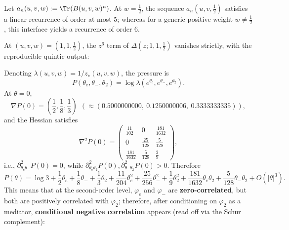 \begin{corollary}\label{cor:sync-kernel-3d-recurrence-drop}
Let \(a_n(u,v,w):=\Tr(B(u,v,w)^n)\).
At \(w=\tfrac12\), the sequence \(a_n(u,v,\tfrac12)\) satisfies a linear recurrence of order at most \(5\);
whereas for a generic positive weight \(w\neq\tfrac12\), this interface yields a recurrence of order \(6\).
\end{corollary}

\begin{proposition}[Critical quintic fingerprint: \texorpdfstring{$(u,v,w)=(1,1,\tfrac12)$}{(u,v,w)=(1,1,1/2)}]\label{prop:sync-kernel-3d-critical-quintic}
At \((u,v,w)=(1,1,\tfrac12)\), the \(z^6\) term of \(\Delta(z;1,1,\tfrac12)\) vanishes strictly, with the reproducible quintic output:

\end{proposition}
Denoting $\lambda(u,v,w)=1/z_\star(u,v,w)$, the pressure is
\[
P(\theta_e,\theta_-,\theta_2)=\log\lambda(e^{\theta_e},e^{\theta_-},e^{\theta_2}).
\]
At $\theta=0$,
\[
\nabla P(0)=\left(\frac12,\frac18,\frac13\right)
\ \ (\approx (0.5000000000,\ 0.1250000006,\ 0.3333333335)),
\]
and the Hessian satisfies
\[
\nabla^2P(0)=
\begin{pmatrix}
\frac{11}{102} & 0 & \frac{181}{1632}\\
0 & \frac{25}{128} & \frac{5}{128}\\
\frac{181}{1632} & \frac{5}{128} & \frac{2}{9}
\end{pmatrix},
\]
i.e., $\partial^2_{\theta_e\theta_-}P(0)=0$, while $\partial^2_{\theta_e\theta_2}P(0),\partial^2_{\theta_-\theta_2}P(0)>0$. Therefore
\[
P(\theta)=\log 3+\frac12\theta_e+\frac18\theta_-+\frac13\theta_2
+\frac{11}{204}\theta_e^2+\frac{25}{256}\theta_-^2+\frac19\theta_2^2
+\frac{181}{1632}\theta_e\theta_2+\frac{5}{128}\theta_-\theta_2+O(|\theta|^3).
\]
This means that at the second-order level, \(\varphi_e\) and \(\varphi_-\) are \textbf{zero-correlated}, but both are positively correlated with \(\varphi_2\); therefore, after conditioning on \(\varphi_2\) as a mediator, \textbf{conditional negative correlation} appears (read off via the Schur complement):



